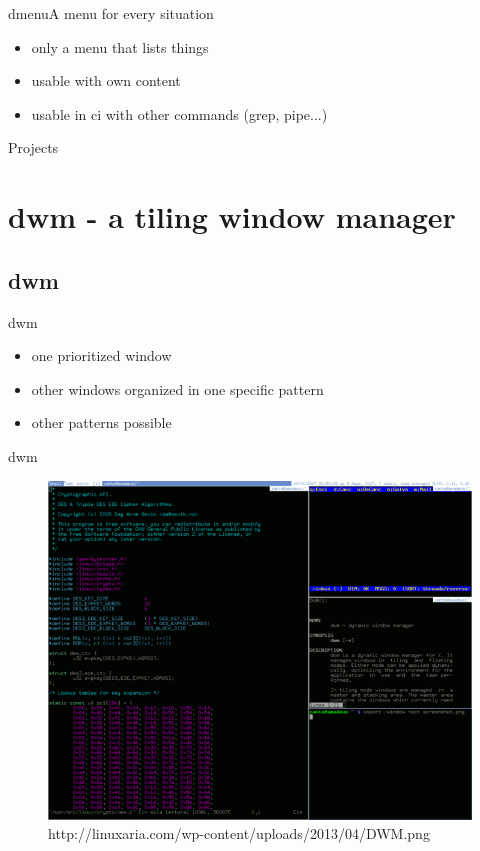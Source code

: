 \documentclass[10pt,graphics,aspectratio=169,table]{beamer}
\begin{document}
\begin{frame}{dmenu}{A menu for every situation}
	\begin{itemize}
		\item only a menu that lists things
		\item usable with own content
		\item usable in ci with other commands (grep, pipe...)
	\end{itemize}
\end{frame}

\begin{frame}{Projects}
    \section*{dwm - a tiling window manager}
    \subsection{dwm}
\end{frame}

\begin{frame}{dwm} 
	\begin{itemize}
		\item one prioritized window
		\item other windows organized in one specific pattern 
		\item other patterns possible
	\end{itemize}
\end{frame}

\begin{frame}{dwm}
    \begin{figure}
        \centering
        \includegraphics[scale=0.35]{DWM.png}
        \caption{http://linuxaria.com/wp-content/uploads/2013/04/DWM.png}
        \label{fig:my_label}
    \end{figure}
\end{frame}
\end{document}
